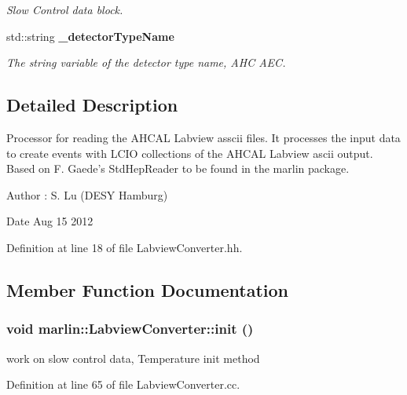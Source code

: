 \begin{DoxyCompactItemize}
\begin{DoxyCompactList}\small\item\em Slow Control data block. \item\end{DoxyCompactList}\item 
std::string {\bf \_\-detectorTypeName}\label{classmarlin_1_1LabviewConverter_a83fa755238559bb5051226ccaaf476a8}

\begin{DoxyCompactList}\small\item\em The string variable of the detector type name, AHC AEC. \item\end{DoxyCompactList}\end{DoxyCompactItemize}


\subsection{Detailed Description}
Processor for reading the AHCAL Labview asscii files. It processes the input data to create events with LCIO collections of the AHCAL Labview ascii output. Based on F. Gaede's StdHepReader to be found in the marlin package. \begin{DoxyAuthor}{Author}
: S. Lu (DESY Hamburg) 
\end{DoxyAuthor}
\begin{DoxyDate}{Date}
Aug 15 2012 
\end{DoxyDate}


Definition at line 18 of file LabviewConverter.hh.

\subsection{Member Function Documentation}
\subsubsection[{init}]{\setlength{\rightskip}{0pt plus 5cm}void marlin::LabviewConverter::init ()\hspace{0.3cm}{\ttfamily  [virtual]}}\label{classmarlin_1_1LabviewConverter_a537a93a94e2ac7ca4f7a7aa1fd9dbb56}


work on slow control data, Temperature init method 

Definition at line 65 of file LabviewConverter.cc.

